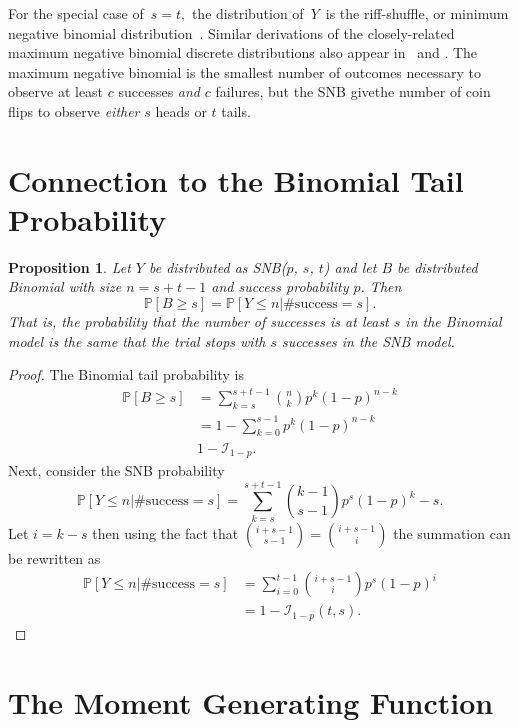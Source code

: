 \documentclass[review]{elsarticle}
\newtheorem{prop}{Proposition}
\begin{document}
For the special case of $\,s=t,$ the distribution of $\,Y\,$ is the
riff-shuffle, or minimum negative binomial distribution~\citep{Uppuluri1970}.
Similar derivations of the closely-related maximum negative binomial 
discrete distributions also appear in~\cite{Zhang2000}
and \cite{Zelterman2005}.
The maximum negative binomial is the smallest number of outcomes necessary to 
observe at least $c$ successes {\em and} $c$ failures, but the SNB givethe 
number of coin flips to observe {\em either} $s$ heads or $t$ tails.

\section{Connection to the Binomial Tail Probability}


\begin{prop} Let $Y$ be distributed as SNB($p$, $s$, $t$) and let 
$B$ be distributed Binomial with size $n=s+t-1$ and success probability
$p$. Then
\begin{equation}
\mathbb{P}[B \geq s] = \mathbb{P} [Y \leq n | \text{\#success} = s].
\end{equation}
That is, the probability that the number of successes is at least $s$
in the Binomial model is the same that the trial stops with $s$ 
successes in the SNB model.
\end{prop}
\begin{proof}
The Binomial tail probability is
\begin{align*}
\mathbb{P}[B \geq s] &= \sum_{k=s}^{s+t-1} {n \choose k} p^k (1-p)^{n-k} \\
  &= 1 - \sum_{k=0}^{s-1} p^k (1-p)^{n-k} \\
  & 1 - \mathcal{I}_{1-p}.
\end{align*}
Next, consider the SNB probability
\begin{equation*}
\mathbb{P} [Y \leq n | \text{\#success} = s] = \sum_{k=s}^{s+t-1}
  {k-1 \choose s-1} p^s (1-p)^k-s.
\end{equation*}
Let $i=k-s$ then using the fact that ${i+s-1 \choose s-1} = {i+s-1 \choose i}$
the summation can be rewritten as
\begin{align}
\mathbb{P} [Y \leq n | \text{\#success} = s] &= \sum_{i=0}^{t-1} 
  {i+s-1 \choose i} p^s (1-p)^i\\
  &= 1 - \mathcal{I}_{1-p}(t, s).
\end{align}
\end{proof}

\section{The Moment Generating Function}
\end{document}
